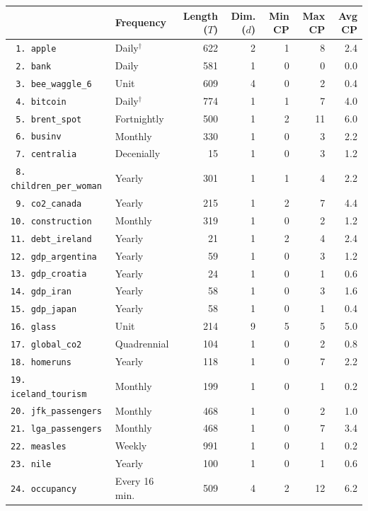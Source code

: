 \begin{tabular}{llrrrrr}
 & Frequency & Length ($T$) & Dim. ($d$) & Min CP & Max CP & Avg CP\\
\toprule
\verb+ 1. apple+ & Daily$^{\dagger}$ & 622 & 2 & 1 & 8 & 2.4 \\
\verb+ 2. bank+ & Daily & 581 & 1 & 0 & 0 & 0.0 \\
\verb+ 3. bee_waggle_6+ & Unit & 609 & 4 & 0 & 2 & 0.4 \\
\verb+ 4. bitcoin+ & Daily$^{\dagger}$ & 774 & 1 & 1 & 7 & 4.0 \\
\verb+ 5. brent_spot+ & Fortnightly & 500 & 1 & 2 & 11 & 6.0 \\
\verb+ 6. businv+ & Monthly & 330 & 1 & 0 & 3 & 2.2 \\
\verb+ 7. centralia+ & Decenially & 15 & 1 & 0 & 3 & 1.2 \\
\verb+ 8. children_per_woman+ & Yearly & 301 & 1 & 1 & 4 & 2.2 \\
\verb+ 9. co2_canada+ & Yearly & 215 & 1 & 2 & 7 & 4.4 \\
\verb+10. construction+ & Monthly & 319 & 1 & 0 & 2 & 1.2 \\
\verb+11. debt_ireland+ & Yearly & 21 & 1 & 2 & 4 & 2.4 \\
\verb+12. gdp_argentina+ & Yearly & 59 & 1 & 0 & 3 & 1.2 \\
\verb+13. gdp_croatia+ & Yearly & 24 & 1 & 0 & 1 & 0.6 \\
\verb+14. gdp_iran+ & Yearly & 58 & 1 & 0 & 3 & 1.6 \\
\verb+15. gdp_japan+ & Yearly & 58 & 1 & 0 & 1 & 0.4 \\
\verb+16. glass+ & Unit & 214 & 9 & 5 & 5 & 5.0 \\
\verb+17. global_co2+ & Quadrennial & 104 & 1 & 0 & 2 & 0.8 \\
\verb+18. homeruns+ & Yearly & 118 & 1 & 0 & 7 & 2.2 \\
\verb+19. iceland_tourism+ & Monthly & 199 & 1 & 0 & 1 & 0.2 \\
\verb+20. jfk_passengers+ & Monthly & 468 & 1 & 0 & 2 & 1.0 \\
\verb+21. lga_passengers+ & Monthly & 468 & 1 & 0 & 7 & 3.4 \\
\verb+22. measles+ & Weekly & 991 & 1 & 0 & 1 & 0.2 \\
\verb+23. nile+ & Yearly & 100 & 1 & 0 & 1 & 0.6 \\
\verb+24. occupancy+ & Every 16 min. & 509 & 4 & 2 & 12 & 6.2 \\

\end{tabular}
